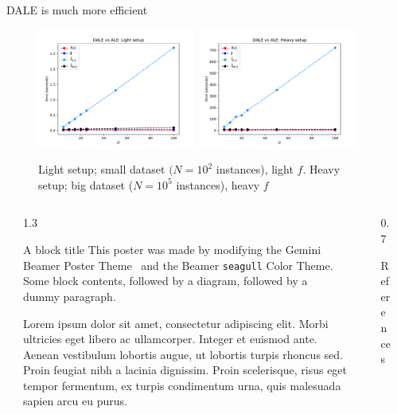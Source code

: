 \documentclass[final]{beamer}
\newlength{\sepwidth}
\newlength{\colwidth}
\newcommand{\separatorcolumn}{\begin{column}{\sepwidth}\end{column}}
\begin{document}
\begin{frame}[t]
\begin{columns}[t]
\begin{column}{\colwidth}
			\begin{block}{DALE is much more efficient}
				
        \begin{figure}[ht]
          \centering
          \includegraphics[width=0.49\textwidth]{./../ACML-paper/images/case-1-plot-1.pdf}
          \includegraphics[width=0.49\textwidth]{./../ACML-paper/images/case-1-plot-2.pdf}
          \caption[Case-1-fig-1]{Light setup; small dataset \((N=10^2\) instances), light \(f\). Heavy setup; big dataset (\(N=10^5\) instances), heavy \(f\)}
        \end{figure}
			\end{block}
		\end{column}
		\separatorcolumn
	\end{columns}

	\begin{columns}[t]\separatorcolumn
	\begin{column}{1.3\colwidth}
	\begin{block}{A block title}
		This poster was made by modifying the Gemini Beamer Poster Theme~\parencite{Athalye2018} and the Beamer \texttt{seagull} Color Theme.
		Some block contents, followed by a diagram, followed by a dummy paragraph.
		
		Lorem ipsum dolor sit amet, consectetur adipiscing elit. Morbi ultricies
		eget libero ac ullamcorper. Integer et euismod ante. Aenean vestibulum
		lobortis augue, ut lobortis turpis rhoncus sed. Proin feugiat nibh a
		lacinia dignissim. Proin scelerisque, risus eget tempor fermentum, ex
		turpis condimentum urna, quis malesuada sapien arcu eu purus.
	\end{block}
	\end{column}
  \separatorcolumn
	\begin{column}{0.7\colwidth}
	\begin{block}{References}
				\printbibliography[heading=none]
	\end{block}
\end{column}
\separatorcolumn
\end{columns}

\end{frame}
\end{document}
